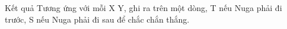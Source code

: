 Kết quả  
Tương ứng với mỗi X Y, ghi ra trên một dòng, T nếu Nuga phải đi trước, S nếu Nuga phải đi sau để chắc chắn thắng.